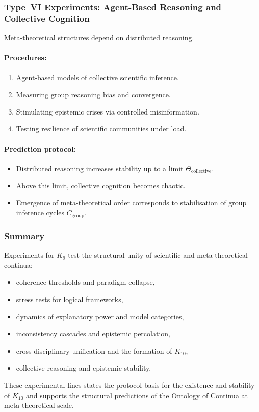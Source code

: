 \subsubsection{Type~VI Experiments: Agent-Based Reasoning and Collective Cognition}

Meta-theoretical structures depend on distributed reasoning.

\paragraph{Procedures:}

\begin{enumerate}
    \item Agent-based models of collective scientific inference.
    \item Measuring group reasoning bias and convergence.
    \item Stimulating epistemic crises via controlled misinformation.
    \item Testing resilience of scientific communities under load.
\end{enumerate}

\paragraph{Prediction protocol:}

\begin{itemize}
    \item Distributed reasoning increases stability up to a limit
          $\Theta_{\mathrm{collective}}$.
    \item Above this limit, collective cognition becomes chaotic.
    \item Emergence of meta-theoretical order corresponds to stabilisation
          of group inference cycles $C_{\mathrm{group}}$.
\end{itemize}



\subsubsection{Summary}

Experiments for $K_9$ test the structural unity of scientific and
meta-theoretical continua:

\begin{itemize}
    \item coherence thresholds and paradigm collapse,
    \item stress tests for logical frameworks,
    \item dynamics of explanatory power and model categories,
    \item inconsistency cascades and epistemic percolation,
    \item cross-disciplinary unification and the formation of $K_{10}$,
    \item collective reasoning and epistemic stability.
\end{itemize}

These experimental lines states the protocol basis for the
existence and stability of $K_{10}$ and supports the structural
predictions of the Ontology of Continua at meta-theoretical scale.
